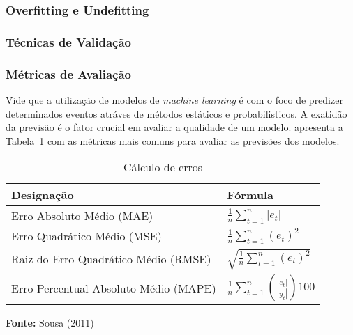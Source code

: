         \subsubsection{Overfitting e Undefitting}

        \subsubsection{Técnicas de Validação}

        \subsubsection{Métricas de Avaliação}
            Vide que a utilização de modelos de \emph{machine learning} é com o foco de predizer determinados eventos atráves
            de métodos estáticos e probabilisticos. A exatidão da previsão é o fator crucial em avaliar a qualidade de um modelo.
             apresenta a Tabela~\ref{fig:tabela-metricas} com as métricas mais comuns para avaliar as previsões
            dos modelos.
            
            \begin{center}
                \begin{table}[h!]
                    \centering
                    \caption{Cálculo de erros}
                    \label{tab:calculo_erros}
                    \begin{tabular}{ll}
                        \toprule
                        \textbf{Designação} & \textbf{Fórmula} \\ 
                        \midrule
                        Erro Absoluto Médio (MAE) & $\frac{1}{n} \sum_{t=1}^{n} |e_t|$ \\[8pt]
                        Erro Quadrático Médio (MSE) & $\frac{1}{n} \sum_{t=1}^{n} (e_t)^2$ \\[8pt]
                        Raiz do Erro Quadrático Médio (RMSE) & $\sqrt{\frac{1}{n} \sum_{t=1}^{n} (e_t)^2}$ \\[8pt]
                        Erro Percentual Absoluto Médio (MAPE) & $\frac{1}{n} \sum_{t=1}^{n} \left(\frac{|e_t|}{|y_t|}\right) 100$ \\ 
                        \bottomrule
                    \end{tabular}
                    
                    \bigskip
                    \small \textbf{Fonte:} Sousa (2011)
                    \label{fig:tabela-metricas}
                \end{table}
            \end{center}
            
